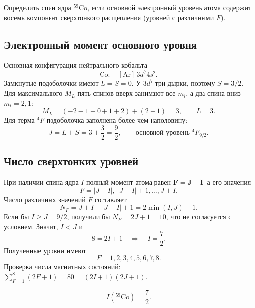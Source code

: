 \documentclass[../final.tex]{subfiles}
\begin{document}
\clearpage
{}

\condition
Определить спин ядра ${}^{59}\mathrm{Co}$, если основной
электронный уровень атома содержит восемь компонент
сверхтонкого расщепления (уровней с различными $F$).

\solution
\subsection*{Электронный момент основного уровня}
Основная конфигурация нейтрального кобальта
\[
    \mathrm{Co}:\quad [\mathrm{Ar}]\,3d^7 4s^2.
\]
Замкнутые подоболочки имеют $L=S=0$. У $3d^7$ три дырки,
поэтому $S=3/2$. Для максимального $M_L$ пять спинов вверх занимают
все $m_l$, а два спина вниз --- $m_l=2,1$:
\[
    M_L=(-2-1+0+1+2)+(2+1)=3,\qquad L=3.
\]
Для терма ${}^4F$ подоболочка заполнена более чем наполовину:
\[
    J=L+S=3+\frac32=\frac92,\qquad
    \text{основной уровень }{}^4F_{9/2}.
\]

\subsection*{Число сверхтонких уровней}
При наличии спина ядра $I$ полный момент атома равен
$\mathbf F=\mathbf J+\mathbf I$, а его значения
\[
    F=|J-I|,\ |J-I|+1,\ldots,J+I.
\]
Число различных значений $F$ составляет
\[
    N_F=J+I-|J-I|+1=2\min(I,J)+1.
\]
Если бы $I\geq J=9/2$, получили бы $N_F=2J+1=10$,
что не согласуется с условием. Значит, $I<J$ и
\[
    8=2I+1\quad\Rightarrow\quad I=\frac72.
\]
Полученные уровни имеют
\[
    F=1,2,3,4,5,6,7,8.
\]
Проверка числа магнитных состояний:
$\sum_{F=1}^{8}(2F+1)=80=(2I+1)(2J+1)$.

\answer
\[
    I({}^{59}\mathrm{Co})=\frac72.
\]
\endgroup
\end{document}
